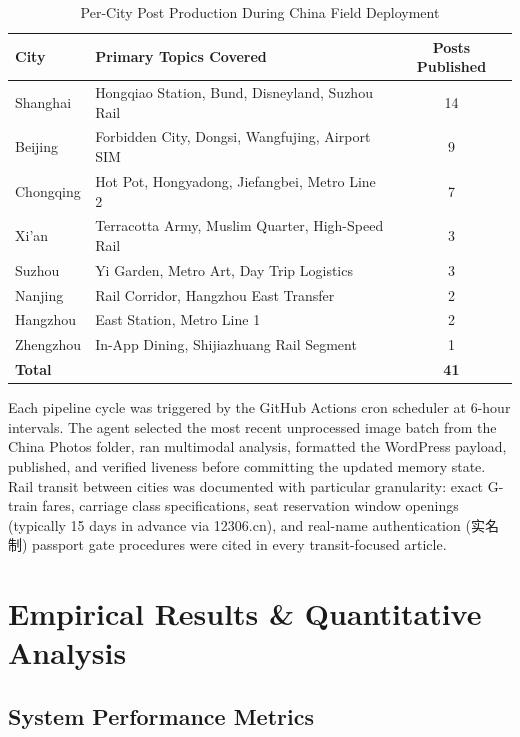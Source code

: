 \documentclass[conference]{IEEEtran}
\begin{document}
\begin{table}[!t]
\caption{Per-City Post Production During China Field Deployment}
\label{tab:cities}
\centering
\begin{tabular}{llc}
\toprule
\textbf{City} & \textbf{Primary Topics Covered} & \textbf{Posts Published} \\
\midrule
Shanghai & Hongqiao Station, Bund, Disneyland, Suzhou Rail & 14 \\
Beijing  & Forbidden City, Dongsi, Wangfujing, Airport SIM & 9  \\
Chongqing & Hot Pot, Hongyadong, Jiefangbei, Metro Line 2 & 7  \\
Xi'an   & Terracotta Army, Muslim Quarter, High-Speed Rail & 3  \\
Suzhou   & Yi Garden, Metro Art, Day Trip Logistics & 3  \\
Nanjing  & Rail Corridor, Hangzhou East Transfer & 2  \\
Hangzhou & East Station, Metro Line 1 & 2  \\
Zhengzhou & In-App Dining, Shijiazhuang Rail Segment & 1  \\
\midrule
\textbf{Total} & & \textbf{41} \\
\bottomrule
\end{tabular}
\end{table}

Each pipeline cycle was triggered by the GitHub Actions cron scheduler at
6-hour intervals. The agent selected the most recent unprocessed image batch
from the China Photos folder, ran multimodal analysis, formatted the WordPress
payload, published, and verified liveness before committing the updated memory
state. Rail transit between cities was documented with particular granularity:
exact G-train fares, carriage class specifications, seat reservation window
openings (typically 15 days in advance via 12306.cn), and real-name
authentication (实名制) passport gate procedures were cited in every
transit-focused article.

\section{Empirical Results \& Quantitative Analysis}
\label{sec:results}

\subsection{System Performance Metrics}
\end{document}
